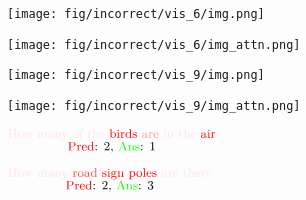 \documentclass{article} \usepackage[dvipsnames,table]{xcolor}
\begin{document}
\begin{figure}[t]
\centering
    \begin{minipage}[t]{0.47\linewidth}
        \begin{minipage}{0.47\linewidth}
            \centering
            \texttt{[image: fig/incorrect/vis\_6/img.png]}
        \end{minipage}
        \begin{minipage}{0.47\linewidth}
            \centering
            \texttt{[image: fig/incorrect/vis\_6/img\_attn.png]}
        \end{minipage}
    \end{minipage}
    \begin{minipage}[t]{0.47\linewidth}
        \begin{minipage}{0.47\linewidth}
            \centering
            \texttt{[image: fig/incorrect/vis\_9/img.png]}
        \end{minipage}
        \begin{minipage}{0.47\linewidth}
            \centering
            \texttt{[image: fig/incorrect/vis\_9/img\_attn.png]}
        \end{minipage}
    \end{minipage}
    
    \centering
    \begin{minipage}[t]{0.47\linewidth}
        \centering
        $\substack{
            \text{\small {\color[rgb]{1,0.9,0.9}How many of the} {\color[rgb]{1,0,0}birds} {\color[rgb]{1,0.6,0.6}are} {\color[rgb]{1,0.9,0.9}in the} {\color[rgb]{1,0,0}air}} \\
            \text{\small {{\color[rgb]{1,0,0}Pred}: 2, {\color[rgb]{0,1,0}Ans}: 1}}
            }$
    \end{minipage}
    \begin{minipage}[t]{0.47\linewidth}
        \centering
        $\substack{
            \text{\small {\color[rgb]{1,0.9,0.9}How many} {\color[rgb]{1,0.3,0.3}road} {\color[rgb]{1,0,0}sign poles} {\color[rgb]{1,0.9,0.9}are there}} \\
            \text{\small {{\color[rgb]{1,0,0}Pred}: 2, {\color[rgb]{0,1,0}Ans}: 3}}
            }$
    \end{minipage}
    

\end{figure}
\end{document}
